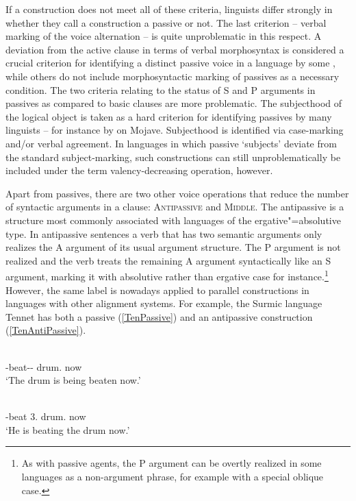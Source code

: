 If a construction does not meet all of these criteria, linguists differ strongly in whether they call a construction a passive or not. 
The last criterion -- verbal marking of the voice alternation -- is quite unproblematic in this respect. A deviation from the active clause in terms of verbal morphosyntax is considered a crucial criterion for identifying a distinct passive voice in a language  by some \citep{WALS107},
while others \citep{Haspelmath:1990,Dryer:1982} do not include morphosyntactic marking of passives as a necessary condition. 
The two criteria relating to the status of S and P arguments in passives as compared to basic clauses are more problematic. 
The subjecthood of the logical object is taken as a hard criterion for identifying passives by many linguists -- for instance by \citet{Munro:1976} on Mojave. 
Subjecthood is identified via case-marking and/or verbal agreement. In languages in which passive `subjects' deviate from the
standard subject-marking, such constructions can still unproblematically be included under the term valency-decreasing operation, however.

Apart from passives, there are two other voice operations that reduce the number of syntactic arguments in a clause: \textsc{Antipassive} and \textsc{Middle}.
The antipassive is a structure most commonly associated with languages of the ergative"=absolutive type.
In antipassive sentences a verb that has two semantic arguments only realizes the A argument of its usual argument structure. 
The P argument is not realized and the verb treats the remaining A argument syntactically like an S argument, marking it with absolutive rather than ergative case for instance.\footnote{As with passive agents, the P argument can be overtly realized in some languages as a non-argument phrase, for example with a special oblique case.} 
However, the same label is nowadays applied to parallel constructions in languages with other alignment systems. 
For example, the Surmic language Tennet has both a passive (\ref{TenPassive}) and an antipassive construction (\ref{TenAntiPassive}).

\begin{exe}\ex\label{TenPassive} 
\begin{xlist}
\ex\gll{}  \\
\ipfv{}-beat-\epen{}-\pass{} drum.\nom{} now\\
\glt `The drum is being beaten now.' 

\ex\gll{}   \\
\ipfv{}-beat 3\sg{}.\nom{} drum.\acc{} now\\
\glt `He is beating the drum now.' 
\end{xlist}
\end{exe}

